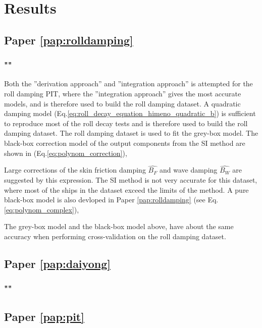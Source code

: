 \chapter{Results\label{ch:results}}

\section{Paper \ref{pap:rolldamping}}
\subsection*{""}
Both the ''derivation approach'' and ''integration approach'' is attempted for the roll damping PIT, where the ''integration approach'' gives the most accurate models, and is therefore used to build the roll damping dataset. A quadratic damping model (Eq.\ref{eq:roll_decay_equation_himeno_quadratic_b}) is sufficient to reproduce most of the roll decay tests and is therefore used to build the roll damping dataset. 
The roll damping dataset is used to fit the grey-box model. The black-box correction model of the output components from the SI method are shown in (Eq.\ref{eq:polynom_correction}),


\noindent Large corrections of the skin friction damping $\hat{B_F}$ and wave damping $\hat{B_W}$ are suggested by this expression. The SI method is not very accurate for this dataset, where most of the ships in the dataset exceed the limits of the method. A pure black-box model is also devloped in Paper \ref{pap:rolldamping} (see Eq.\ref{eq:polynom_complex}),


\noindent The grey-box model and the black-box model above, have about the same accuracy when performing cross-validation on the roll damping dataset.

\section{Paper \ref{pap:daiyong}}
\subsection*{""}

\section{Paper \ref{pap:pit}}
